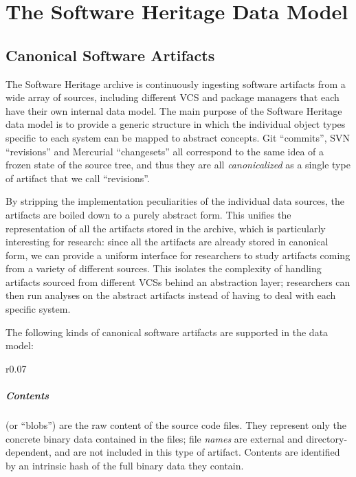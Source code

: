 \chapter{The Software Heritage Data Model}


\section{Canonical Software Artifacts}

The Software Heritage archive is continuously ingesting software artifacts from
a wide array of sources, including different VCS and package managers that
each have their own internal data model. The main purpose of the Software
Heritage data model is to provide a generic structure in which the individual
object types specific to each system can be mapped to abstract concepts.  Git
``commits'', SVN ``revisions'' and Mercurial ``changesets'' all correspond to
the same idea of a frozen state of the source tree, and thus they are all
\emph{canonicalized} as a single type of artifact that we call ``revisions''.

By stripping the implementation peculiarities of the individual data sources,
the artifacts are boiled down to a purely abstract form. This unifies the
representation of all the artifacts stored in the archive, which is
particularly interesting for research: since all the artifacts are already
stored in canonical form, we can provide a uniform interface for researchers
to study artifacts coming from a variety of different sources. This isolates
the complexity of handling artifacts sourced from different \glspl{VCS} behind
an abstraction layer; researchers can then run analyses on the abstract
artifacts instead of having to deal with each specific system.

The following kinds of canonical software artifacts are supported in the data
model:

\begin{wrapfigure}{r}{0.07\textwidth}\centering
{}
\end{wrapfigure}
\paragraph{\textbf{Contents}} (or ``blobs'') are the raw content of the source
code files. They represent only the concrete binary data contained in the
files; file \emph{names} are external and directory-dependent, and are not
included in this type of artifact. Contents are identified by an intrinsic hash
of the full binary data they contain.


